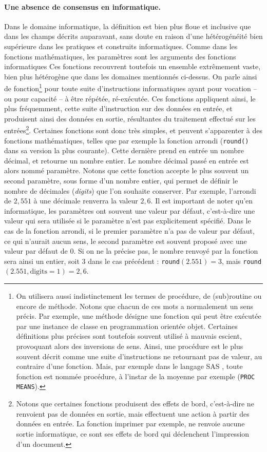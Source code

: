\paragraph{Une absence de consensus en informatique.}
Dans le domaine informatique, la définition est bien plus floue et inclusive que dans les champs décrits auparavant, sans doute en raison d'une hétérogénéité bien supérieure dans les pratiques et construits informatiques.
Comme dans les fonctions mathématiques, les paramètres sont les arguments des fonctions informatiques
Ces fonctions recouvrent toutefois un ensemble extrêmement vaste, bien plus hétérogène que dans les domaines mentionnés ci-dessus.
On parle ainsi de fonction\footnote{
	On utilisera aussi indistinctement les termes de procédure, de (sub)routine ou encore de méthode.
	Notons que chacun de ces mots a normalement un sens précis.
	Par exemple, une méthode désigne une fonction qui peut être exécutée par une instance de classe en programmation orientée objet.
	Certaines définitions plus précises sont toutefois souvent utilisé à mauvais escient, provoquant alors des inversions de sens.
	Ainsi, une procédure est le plus souvent décrit comme une suite d'instructions ne retournant pas de valeur, au contraire d'une fonction.
	Mais, par exemple dans le langage SAS \autocite{sas1990sas}, toute fonction est nommée procédure, à l'instar de la moyenne par exemple (\texttt{PROC MEANS}).
} pour toute suite d'instructions informatiques ayant pour vocation -- ou pour capacité -- à être répétée, ré-exécutée.
Ces fonctions appliquent ainsi, le plus fréquemment, cette suite d'instruction sur des données en entrée, et produisent ainsi des données en sortie, résultantes du traitement effectué sur les entrées\footnote{
	Notons que certaines fonctions produisent des \og effets de bord\fg{}, c'est-à-dire ne renvoient pas de données en sortie, mais effectuent une action à partir des données en entrée.
	La fonction imprimer par exemple, ne renvoie aucune sortie informatique, ce sont ses effets de bord qui déclenchent l'impression d'un document.
}.
Certaines fonctions sont donc très simples, et peuvent s'apparenter à des fonctions mathématiques, telles que par exemple la fonction arrondi (\texttt{round()} dans sa version la plus courante).
Cette dernière prend en entrée un nombre décimal, et retourne un nombre entier.
Le nombre décimal passé en entrée est alors nommé paramètre. Notons que cette fonction accepte le plus souvent un second paramètre, sous forme d'un nombre entier, qui permet de définir le nombre de décimales (\textit{digits}) que l'on souhaite conserver.
Par exemple, l'arrondi de $2,551$ à une décimale renverra la valeur $2,6$.
Il est important de noter qu'en informatique, les paramètres ont souvent une \og valeur par défaut\fg{}, c'est-à-dire une valeur qui sera utilisée si le paramètre n'est pas explicitement spécifié.
Dans le cas de la fonction arrondi, si le premier paramètre n'a pas de valeur par défaut, ce qui n'aurait aucun sens, le second paramètre est souvent proposé avec une valeur par défaut de $0$.
Si on ne la précise pas, le nombre renvoyé par la fonction sera ainsi un entier, soit $3$ dans le cas précédent :
\texttt{round}$(2.551) = 3$, mais \texttt{round}$(2.551, \text{digits} = 1) = 2,6$.

